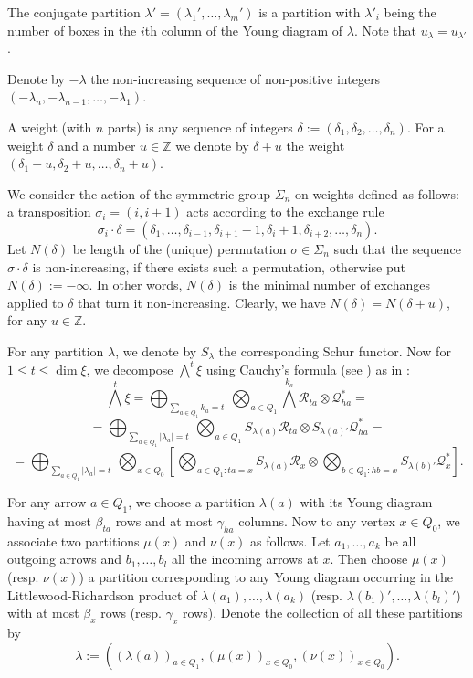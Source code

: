 \documentclass[twoside]{article}
\newcommand{\integ}{\mathbb{Z}}
\theoremstyle{definition}
\begin{document}
The conjugate partition $\lambda'=(\lambda_1',\dots, \lambda_m')$ is a partition with $\lambda'_i$ being the number of boxes in the $i$th column of the Young diagram of $\lambda$. Note that $u_{\lambda}=u_{\lambda'}$.

Denote by $-\lambda$ the non-increasing sequence of non-positive integers $(-\lambda_n,-\lambda_{n-1},\dots, -\lambda_1)$.

A weight (with $n$ parts) is any sequence of integers  $\delta:=(\delta_1, \delta_2,\dots ,\delta_n)$. For a weight $\delta$ and a number $u\in\integ$ we denote by $\delta+u$ the weight $(\delta_1+u,\delta_2+u,\dots, \delta_n+u)$. 

We consider the action of the symmetric group $\Sigma_n$ on weights defined as follows: a transposition $\sigma_i=(i,i+1)$ acts according to the exchange rule
$$\sigma_i \cdot \delta = (\delta_1,\dots ,\delta_{i-1},\delta_{i+1}-1,\delta_{i}+1,\delta_{i+2},\dots,\delta_n).$$ 
Let $N(\delta)$ be length of the (unique) permutation $\sigma\in \Sigma_n$ such that the sequence $\sigma \cdot \delta$ is non-increasing, if there exists such a permutation, otherwise put $N(\delta):=-\infty$. In other words, $N(\delta)$ is the minimal number of exchanges applied to $\delta$ that turn it non-increasing. Clearly, we have $N(\delta)=N(\delta+u)$, for any $u\in\integ$.

\vspace{0.1in}

For any partition $\lambda$, we denote by $S_\lambda$ the corresponding Schur functor. Now for $1\leq t \leq \dim \xi$, we decompose $\bigwedge^{t} \xi$ using Cauchy's formula (see \cite{jerzy}) as in \cite{kavita}:
$$\bigwedge^{t} \xi = \bigoplus_{\sum_{a\in Q_1}\!\! k_a = t}\, \bigotimes_{a\in Q_1} \bigwedge^{k_a} \mathcal{R}_{ta}\otimes \mathcal{Q}_{ha}^*=$$
$$= \bigoplus_{\sum_{a\in Q_1}\!\! |\lambda_a| = t}\, \bigotimes_{a\in Q_1} S_{\lambda(a)} \mathcal{R}_{ta}\otimes S_{\lambda(a)'} \mathcal{Q}_{ha}^*=$$
\begin{equation}\label{eq:cauchy}
=\bigoplus_{\sum_{a\in Q_1} \!\! |\lambda_a| = t}\, \bigotimes_{x\in Q_0}\left[ \bigotimes_{a\in Q_1 : ta=x} S_{\lambda(a)}\mathcal{R}_{x}\otimes \bigotimes_{b\in Q_1 : hb=x} S_{\lambda(b)'} \mathcal{Q}_{x}^*\right].
\end{equation}

For any arrow $a\in Q_1$, we choose a partition $\lambda(a)$ with its Young diagram having at most $\beta_{ta}$ rows and at most $\gamma_{ha}$ columns. Now to any vertex $x\in Q_0$, we associate two partitions $\mu(x)$ and $\nu(x)$ as follows. Let $a_1,\dots , a_k$ be all outgoing arrows and $b_1,\dots, b_l$ all the incoming arrows at $x$. Then choose $\mu(x)$ (resp. $\nu(x)$) a partition corresponding to any Young diagram occurring in the Littlewood-Richardson product of $\lambda(a_1),\dots , \lambda(a_k)$ (resp. $\lambda(b_1)',\dots,\lambda(b_l)'$) with at most $\beta_x$ rows (resp. $\gamma_x$ rows). Denote the collection of all these partitions by
\begin{equation}
\label{eq:coll}
\underline{\lambda}:= ( (\lambda(a))_{a\in Q_1},(\mu(x))_{x\in Q_0},(\nu(x))_{x\in Q_0}).
\end{equation}
\end{document}
